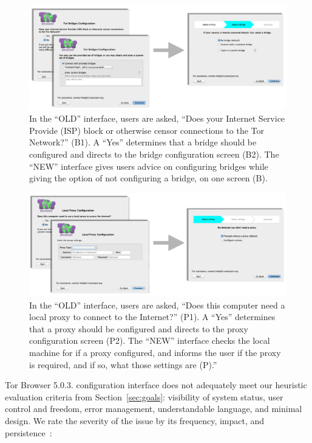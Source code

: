 \documentclass[USenglish,oneside,twocolumn]{article}
\begin{document}
\begin{figure}[t]
	\centering
		\includegraphics[width=.8\textwidth]{bridge-screens.pdf} 
		\caption{In the ``OLD'' interface, users are asked, ``Does your Internet Service Provide (ISP) block or 
		otherwise censor connections to the Tor Network?'' (B1). A ``Yes'' determines that a bridge should 
		be configured and directs to the bridge configuration screen (B2). 
		The ``NEW'' interface gives users advice on configuring bridges
		while giving the option of not configuring a bridge, on one screen (B).} 
\end{figure} 

\begin{figure}[t]
	\centering
		\includegraphics[width=.8\textwidth]{proxy-screens.pdf} 
		\caption{In the ``OLD'' interface, users are asked, ``Does this computer need a local proxy to connect
		to the Internet?'' (P1). A ``Yes'' determines that a proxy should be configured and directs to the 
		proxy configuration screen (P2). The ``NEW'' interface checks the local machine for if a proxy configured,
		and informs the user if the proxy is required, and if so, what those settings are (P).'' }
\end{figure} 

Tor Browser 5.0.3. configuration interface does not adequately meet our heuristic evaluation criteria from Section~\ref{sec:goals}: visibility of system status, user control and freedom, error management, understandable language, and minimal design. We rate the severity of the issue by its frequency, impact, and persistence~\cite{nielsen1994heuristic}:\\
\end{document}
